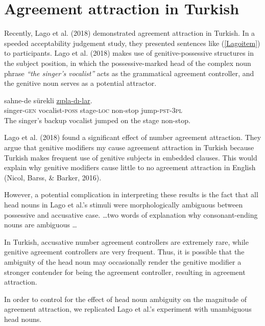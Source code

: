 \documentclass[english,doc]{apa6}
\begin{document}
\hypertarget{agreement-attraction-in-turkish}{%
\section{Agreement attraction in Turkish}\label{agreement-attraction-in-turkish}}

Recently, Lago et al. (2018) demonstrated agreement attraction in Turkish. In a speeded acceptability judgement study, they presented sentences like (\ref{Lagoitem}) to participants.
Lago et al. (2018) makes use of genitive-possessive structures in the subject position, in which the possessive-marked head of the complex noun phrase \emph{\enquote{the singer's vocalist}} acts as the grammatical agreement controller, and the genitive noun serves as a potential attractor.

\begin{exe}
\ex \label{Lagoitem}
 sahne-de sürekli \underline{zıpla-dı-lar}.\\
singer-\textsc{gen} vocalist-\textsc{poss} stage-\textsc{loc} non-stop jump-\textsc{pst}-\textsc{3pl}\\
\glt The singer's backup vocalist jumped on the stage non-stop.
\end{exe}

Lago et al. (2018) found a significant effect of number agreement attraction.
They argue that genitive modifiers my cause agreement attraction in Turkish because Turkish makes frequent use of genitive subjects in embedded clauses. This would explain why genitive modifiers cause little to no agreement attraction in English
(Nicol, Barss, \& Barker, 2016).

However, a potential complication in interpreting these results is the fact that all head nouns in Lago et al.'s stimuli were morphologically ambiguous between possessive and accusative case.
\ldots two words of explanation why consonant-ending nouns are ambiguous \ldots

In Turkish, accusative number agreement controllers are extremely rare, while genitive agreement controllers are very frequent. Thus, it is possible that the ambiguity of the head noun may occasionally render the genitive modifier a stronger contender for being the agreement controller, resulting in agreement attraction.

In order to control for the effect of head noun ambiguity on the magnitude of agreement attraction, we replicated Lago et al.'s experiment with unambiguous head nouns.
\end{document}
